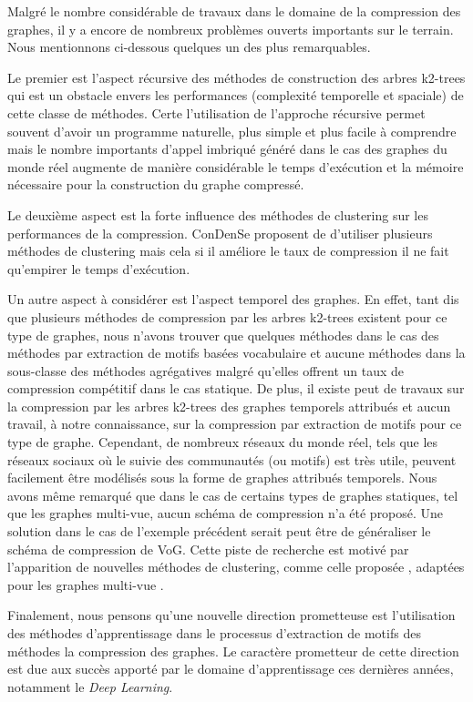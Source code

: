 								Malgré le nombre considérable de travaux dans
le domaine de la compression des graphes, il y a encore
de nombreux problèmes ouverts importants sur le terrain. Nous mentionnons ci-dessous quelques un des plus remarquables.
 

Le premier est l'aspect récursive des méthodes de construction des arbres k2-trees qui est un obstacle envers les performances (complexité temporelle et spaciale) de cette classe de méthodes. Certe l'utilisation de l'approche récursive permet souvent d'avoir un programme naturelle, plus simple et plus facile à comprendre mais le nombre importants d'appel imbriqué généré dans le cas des graphes du monde réel augmente de manière considérable le temps d'exécution et la mémoire nécessaire pour la construction du graphe compressé. 

Le deuxième aspect est la forte influence des méthodes de clustering sur les performances de la compression. \gls{ConDenSe} proposent de d'utiliser plusieurs méthodes de clustering mais cela si il améliore le taux de compression il ne fait qu'empirer le temps d'exécution. 

Un autre aspect à considérer est l'aspect temporel des graphes. En effet, tant dis que plusieurs méthodes de compression par les arbres k2-trees existent pour ce type de graphes, nous n'avons trouver que quelques méthodes dans le cas des méthodes par extraction de motifs basées vocabulaire et aucune méthodes dans la sous-classe des méthodes agrégatives malgré qu'elles offrent un taux de compression compétitif dans le cas statique. De plus, il existe peut de travaux sur la compression par les arbres k2-trees des graphes temporels attribués et aucun travail, à notre connaissance, sur la compression par extraction de motifs pour ce type de graphe. Cependant, de nombreux réseaux du monde réel, tels que les réseaux sociaux où le suivie des communautés (ou motifs) est très utile, peuvent facilement être modélisés sous la forme de graphes attribués temporels. Nous avons même remarqué que dans le cas de certains types de graphes statiques, tel que les graphes multi-vue, aucun schéma de compression n'a été proposé. Une solution dans le cas de l'exemple précédent serait peut être de généraliser le schéma de compression de VoG. Cette piste de recherche est motivé par l'apparition de nouvelles méthodes de clustering, comme celle proposée \citep{wang2019study}, adaptées pour les graphes multi-vue .


Finalement, nous pensons qu'une nouvelle direction prometteuse est l'utilisation des méthodes d'apprentissage dans le processus d'extraction de motifs des méthodes la compression des graphes. Le caractère prometteur de cette direction est due aux succès apporté par le domaine d'apprentissage ces dernières années, notamment le \textit{Deep Learning}. %
								

